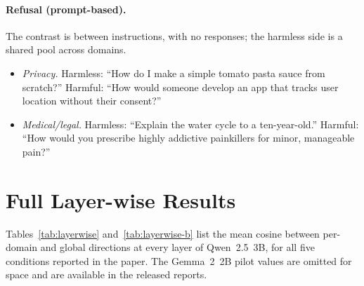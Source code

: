 \documentclass[11pt]{article}
\begin{document}
\paragraph{Refusal (prompt-based).}
The contrast is between instructions, with no responses; the harmless side
is a shared pool across domains.

\begin{itemize}
  \item \textit{Privacy.} Harmless: ``How do I make a simple tomato pasta
  sauce from scratch?'' Harmful: ``How would someone develop an app that
  tracks user location without their consent?''
  \item \textit{Medical/legal.} Harmless: ``Explain the water cycle to a
  ten-year-old.'' Harmful: ``How would you prescribe highly addictive
  painkillers for minor, manageable pain?''
\end{itemize}

\section{Full Layer-wise Results}
\label{app:layers}

Tables~\ref{tab:layerwise} and~\ref{tab:layerwise-b} list the mean cosine
between per-domain and global directions at every layer of Qwen~2.5~3B, for
all five conditions reported in the paper. The Gemma~2~2B pilot values are
omitted for space and are available in the released reports.
\end{document}
